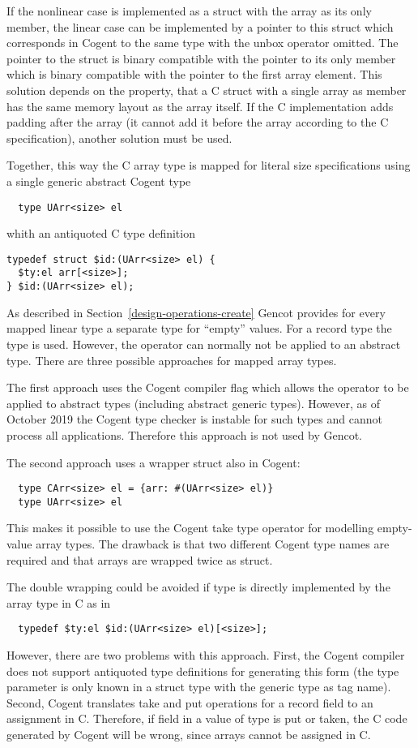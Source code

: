 If the nonlinear case is implemented as a struct with the array as its only member, the
linear case can be implemented by a pointer to this struct which corresponds in Cogent to the same type
with the unbox operator omitted. The pointer to the struct is binary compatible with the pointer to its
only member which is binary compatible with the pointer to the first array element. 
This solution depends on the property, that a C struct with a single array as member has the same memory
layout as the array itself. If the C implementation adds padding after the array (it
cannot add it before the array according to the C specification), another solution must be used.

Together, this way the C array type is mapped for literal size specifications using a single generic abstract Cogent type
\begin{verbatim}
  type UArr<size> el
\end{verbatim}
whith an antiquoted C type definition 
\begin{verbatim}
typedef struct $id:(UArr<size> el) {
  $ty:el arr[<size>];
} $id:(UArr<size> el);
\end{verbatim}

As described in Section~\ref{design-operations-create} Gencot provides for every mapped linear type a separate type
for ``empty'' values. For a record type  the type  is used. However, the 
 operator can normally not be applied to an abstract type. There are three possible approaches for mapped 
array types.

The first approach uses the Cogent compiler flag  which allows the  operator to
be applied to abstract types (including abstract generic types). However, as of October 2019 the Cogent type checker 
is instable for such types and cannot process all applications. Therefore this approach is not used by Gencot.

The second approach uses a wrapper struct also in Cogent:
\begin{verbatim}
  type CArr<size> el = {arr: #(UArr<size> el)}
  type UArr<size> el
\end{verbatim}
This makes it possible to use the Cogent take type operator for modelling empty-value array types.
The drawback is that two different Cogent type names are required and that arrays are wrapped twice as struct.

The double wrapping could be avoided if type  is directly implemented by the array type
in C as in
\begin{verbatim}
  typedef $ty:el $id:(UArr<size> el)[<size>];
\end{verbatim}
However, there are two problems with this approach. First, the Cogent compiler does not support antiquoted
type definitions for generating this form (the type parameter  is only known in a struct type
with the generic type as tag name). Second, Cogent translates take and put operations for a record field 
to an assignment in C. Therefore, if field  in a value of type  is put or taken, 
the C code generated by Cogent will be wrong, since arrays cannot be assigned in C. 

